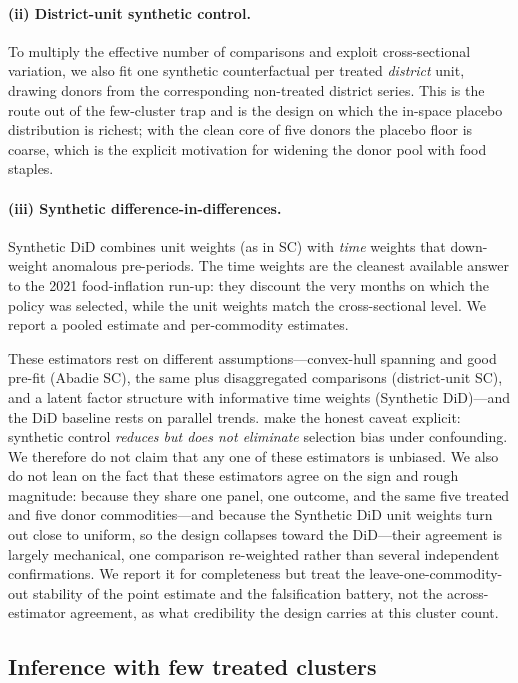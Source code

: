 \paragraph{(ii) District-unit synthetic control.}
To multiply the effective number of comparisons and exploit cross-sectional variation, we
also fit one synthetic counterfactual per treated \emph{district} unit, drawing donors from
the corresponding non-treated district series. This is the route out of the few-cluster
trap and is the design on which the in-space placebo distribution is richest; with the clean
core of five donors the placebo floor is coarse, which is the explicit motivation for
widening the donor pool with food staples.

\paragraph{(iii) Synthetic difference-in-differences.}
Synthetic DiD \citep{Arkhangelsky2021} combines unit weights (as in SC) with \emph{time}
weights that down-weight anomalous pre-periods. The time weights are the cleanest available
answer to the 2021 food-inflation run-up: they discount the very months on which the policy
was selected, while the unit weights match the cross-sectional level. We report a pooled
estimate and per-commodity estimates.

These estimators rest on different assumptions---convex-hull spanning and good pre-fit
(Abadie SC), the same plus disaggregated comparisons (district-unit SC), and a latent
factor structure with informative time weights (Synthetic DiD)---and the DiD baseline rests
on parallel trends. \citet{FermanPinto} make the honest caveat explicit: synthetic control
\emph{reduces but does not eliminate} selection bias under confounding. We therefore do not
claim that any one of these estimators is unbiased. We also do not lean on the fact that these
estimators agree on the sign and rough magnitude: because they share one panel, one outcome,
and the same five treated and five donor commodities---and because the Synthetic DiD unit
weights turn out close to uniform, so the design collapses toward the DiD---their agreement is
largely mechanical, one comparison re-weighted rather than several independent confirmations.
We report it for completeness but treat the leave-one-commodity-out stability of the point
estimate and the falsification battery, not the across-estimator agreement, as what credibility
the design carries at this cluster count.

\subsection{Inference with few treated clusters}
\label{ssec:inference}

